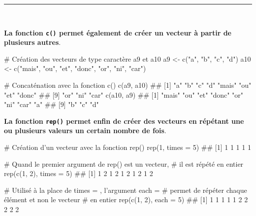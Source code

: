 \documentclass[12pt,twosided, notitlepage]{book}
\newenvironment{Shaded}{}{}
\newcommand{\KeywordTok}[1]{\textcolor[rgb]{0.00,0.00,1.00}{{#1}}}
\newcommand{\DataTypeTok}[1]{{#1}}
\newcommand{\DecValTok}[1]{{#1}}
\newcommand{\StringTok}[1]{\textcolor[rgb]{0.00,0.50,0.50}{{#1}}}
\newcommand{\CommentTok}[1]{\textcolor[rgb]{0.00,0.50,0.00}{{#1}}}
\newcommand{\NormalTok}[1]{{#1}}
\renewenvironment{Shaded}{\begin{snugshade}}{\end{snugshade}}
\begin{document}
\begin{center}\rule{0.5\linewidth}{\linethickness}\end{center}

~

\textbf{La fonction \texttt{c()} permet également de créer un vecteur à
partir de plusieurs autres}.

\begin{Shaded}
\begin{Highlighting}[]
\CommentTok{# Création des vecteurs de type caractère a9 et a10}
\NormalTok{a9 <-}\StringTok{ }\KeywordTok{c}\NormalTok{(}\StringTok{"a"}\NormalTok{, }\StringTok{"b"}\NormalTok{, }\StringTok{"c"}\NormalTok{, }\StringTok{"d"}\NormalTok{)}
\NormalTok{a10 <-}\StringTok{ }\KeywordTok{c}\NormalTok{(}\StringTok{"mais"}\NormalTok{, }\StringTok{"ou"}\NormalTok{, }\StringTok{"et"}\NormalTok{, }\StringTok{"donc"}\NormalTok{, }\StringTok{"or"}\NormalTok{, }\StringTok{"ni"}\NormalTok{, }\StringTok{"car"}\NormalTok{)}

\CommentTok{# Concaténation avec la fonction c()}
\KeywordTok{c}\NormalTok{(a9, a10)}
  \NormalTok{##  [1] "a"    "b"    "c"    "d"    "mais" "ou"   "et"   "donc"}
  \NormalTok{##  [9] "or"   "ni"   "car"}
\KeywordTok{c}\NormalTok{(a10, a9)}
  \NormalTok{##  [1] "mais" "ou"   "et"   "donc" "or"   "ni"   "car"  "a"   }
  \NormalTok{##  [9] "b"    "c"    "d"}
\end{Highlighting}
\end{Shaded}

\textbf{La fonction \texttt{rep()} permet enfin de créer des vecteurs en
répétant une ou plusieurs valeurs un certain nombre de
fois}.

\begin{Shaded}
\begin{Highlighting}[]
\CommentTok{# Création d'un vecteur avec la fonction rep()}
\KeywordTok{rep}\NormalTok{(}\DecValTok{1}\NormalTok{, }\DataTypeTok{times =} \DecValTok{5}\NormalTok{)}
  \NormalTok{## [1] 1 1 1 1 1}

\CommentTok{# Quand le premier argument de rep() est un vecteur, }
\CommentTok{# il est répété en entier}
\KeywordTok{rep}\NormalTok{(}\KeywordTok{c}\NormalTok{(}\DecValTok{1}\NormalTok{, }\DecValTok{2}\NormalTok{), }\DataTypeTok{times =} \DecValTok{5}\NormalTok{)}
  \NormalTok{##  [1] 1 2 1 2 1 2 1 2 1 2}

\CommentTok{# Utilisé à la place de times = , l'argument each = }
\CommentTok{# permet de répéter chaque élément et non le vecteur}
\CommentTok{# en entier}
\KeywordTok{rep}\NormalTok{(}\KeywordTok{c}\NormalTok{(}\DecValTok{1}\NormalTok{, }\DecValTok{2}\NormalTok{), }\DataTypeTok{each =} \DecValTok{5}\NormalTok{)}
  \NormalTok{##  [1] 1 1 1 1 1 2 2 2 2 2}
\end{Highlighting}
\end{Shaded}
\end{document}
